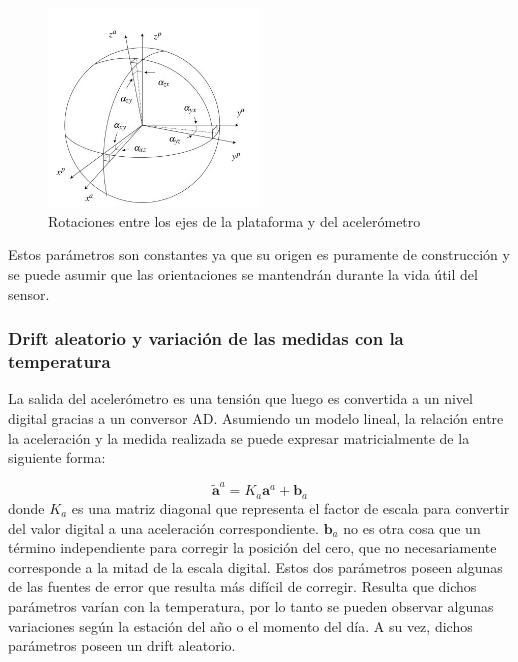 \documentclass[main]{subfiles}
\begin{document}
\begin{figure}
  \vspace{-20pt}
  \begin{center}
    \includegraphics[width=0.5\textwidth]{./pics_acc/ejes_acc.jpg}
  \end{center}
  \vspace{-20pt}
  \caption{Rotaciones entre los ejes de la plataforma y del acelerómetro}
  \label{fig:ejes}
  \vspace{-10pt}
\end{figure}

Estos parámetros son constantes ya que su origen es puramente de construcción y se puede asumir que las orientaciones se mantendrán durante la vida útil del sensor.

\subsubsection*{Drift aleatorio y variación de las medidas con la temperatura}

La salida del acelerómetro es una tensión que luego es convertida a un nivel digital gracias a un conversor AD. Asumiendo un modelo lineal, la relación entre la aceleración y la medida realizada se puede expresar matricialmente de la siguiente forma:
 
$$\tilde{\mathbf{a}}^a = K_a \mathbf{a}^a + \mathbf{b}_a$$ donde $K_a$ es una matriz diagonal que representa el factor de escala para convertir del valor digital a una aceleración correspondiente. $\mathbf{b}_a$ no es otra cosa que un término independiente para corregir la posición del cero, que no necesariamente corresponde a la mitad de la escala digital. Estos dos parámetros poseen algunas de las fuentes de error que resulta más difícil de corregir. Resulta que dichos parámetros varían con la temperatura, por lo tanto se pueden observar algunas variaciones según la estación del año o el momento del día. A su vez, dichos parámetros poseen un drift aleatorio. 
\end{document}
